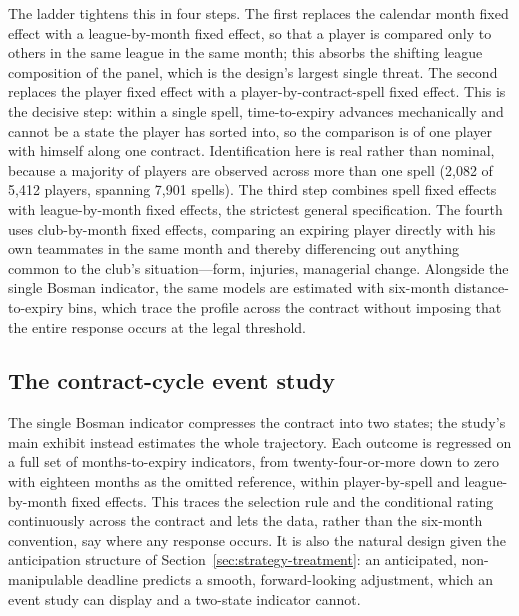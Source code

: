 The ladder tightens this in four steps. The first replaces the calendar month
fixed effect with a league-by-month fixed effect, so that a player is compared only
to others in the same league in the same month; this absorbs the shifting league
composition of the panel, which is the design's largest single threat. The second
replaces the player fixed effect with a player-by-contract-spell fixed effect. This
is the decisive step: within a single spell, time-to-expiry advances mechanically
and cannot be a state the player has sorted into, so the comparison is of one
player with himself along one contract. Identification here is real rather than
nominal, because a majority of players are observed across more than one spell
(2{,}082 of 5{,}412 players, spanning 7{,}901 spells). The third step combines
spell fixed effects with league-by-month fixed effects, the strictest general
specification. The fourth uses club-by-month fixed effects, comparing an expiring
player directly with his own teammates in the same month and thereby differencing
out anything common to the club's situation---form, injuries, managerial change.
Alongside the single Bosman indicator, the same models are estimated with six-month
distance-to-expiry bins, which trace the profile across the contract without
imposing that the entire response occurs at the legal threshold.

\subsection{The contract-cycle event study}
\label{sec:strategy-eventstudy}

The single Bosman indicator compresses the contract into two states; the study's
main exhibit instead estimates the whole trajectory. Each outcome is regressed on a
full set of months-to-expiry indicators, from twenty-four-or-more down to zero with
eighteen months as the omitted reference, within player-by-spell and
league-by-month fixed effects. This traces the selection rule and the conditional
rating continuously across the contract and lets the data, rather than the
six-month convention, say where any response occurs. It is also the natural design
given the anticipation structure of Section~\ref{sec:strategy-treatment}: an
anticipated, non-manipulable deadline predicts a smooth, forward-looking adjustment,
which an event study can display and a two-state indicator cannot.

